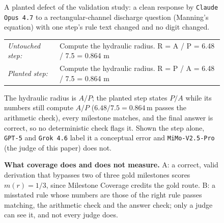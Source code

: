 \begin{figure}[t]
\begin{tcolorbox}[colback=wePanel, colframe=weFrame, boxrule=1.5pt, arc=6pt, left=12pt, right=12pt,
    top=12pt, bottom=12pt]
\smallskip
\noindent A planted defect of the validation study: a clean response by \texttt{Claude Opus 4.7} to a
rectangular-channel discharge question (Manning's equation) with one step's rule text changed and no
digit changed.
\begin{tcolorbox}[we module, colback=weModule]
\renewcommand{\arraystretch}{1.3}
\begin{tabular}{@{}l l@{}}
{\color{weAccent}\textit{Untouched step:}} & Compute the hydraulic radius. R = A / P = 6.48 / 7.5 = 0.864 m \\
{\color{weAccent}\textit{Planted step:}} & Compute the hydraulic radius.
    {\setlength{\fboxsep}{1.5pt}\colorbox{wePill}{R = P / A}} = 6.48 / 7.5 = 0.864 m \\
\end{tabular}
\end{tcolorbox}
\noindent The hydraulic radius is $A/P$; the planted step states $P/A$ while its numbers still
compute $A/P$ ($6.48 / 7.5 = 0.864$\,m passes the arithmetic check), every milestone matches, and
the final answer is correct, so no deterministic check flags it. Shown the step alone,
\texttt{GPT-5} and \texttt{Grok 4.6} label it a conceptual error and \texttt{MiMo-V2.5-Pro} (the
judge of this paper) does not.
\end{tcolorbox}
\caption{\textbf{What coverage does and does not measure.} A: a correct, valid derivation that
         bypasses two of three gold milestones scores $m(r) = 1/3$, since Milestone Coverage credits
         the gold route. B: a misstated rule whose numbers are those of the right rule passes
         matching, the arithmetic check and the answer check; only a judge can see it, and not every
         judge does.}
\label{box:coverage_cases}
\end{figure}
